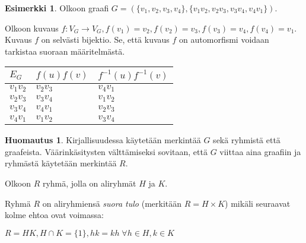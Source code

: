 \documentclass[a4paper, 12pt]{article}
\theoremstyle{definition}
\newtheorem{huom}{Huomautus}
\newtheorem{example}[mydef]{Esimerkki}
\theoremstyle{plain}
\begin{document}
\begin{example}
\label{ex:d4}
Olkoon graafi $G = (\{v_1, v_2, v_3, v_4\}, \{v_1v_2, v_2v_3, v_3v_4, v_4v_1\})$.

\begin{center}
\end{center}

Olkoon kuvaus $f: V_G \rightarrow V_G, f(v_1) = v_2, f(v_2) = v_3, f(v_3) = v_4, f(v_4) = v_1$. Kuvaus $f$ on selvästi bijektio. Se, että kuvaus $f$ on automorfismi voidaan tarkistaa suoraan määritelmästä.

\begin{center}
\begin{tabular} {l l l}
$E_G$ & $f(u)f(v)$ & $f^{-1}(u)f^{-1}(v)$ \\
\hline
$v_1v_2$ & $ v_2v_3$ & $v_4v_1$ \\
$v_2v_3$ & $ v_3v_4$ & $v_1v_2$ \\
$v_3v_4$ & $v_4v_1$ & $v_2v_3$ \\
$v_4v_1$ & $v_1v_2$ &  $v_3v_4$ \\
\end{tabular}

\end{center}
\end{example}

\begin{huom}
Kirjallisuudessa käytetään merkintää $G$ sekä ryhmistä että graafeista. Väärinkäsitysten välttämiseksi sovitaan, että $G$ viittaa aina graafiin ja ryhmästä käytetään merkintää $R$.
\end{huom}

Olkoon $R$ ryhmä, jolla on aliryhmät $H$ ja $K$. 

Ryhmä $R$ on aliryhmiensä \emph{suora tulo} (merkitään $R = H \times K$) mikäli seuraavat kolme ehtoa ovat voimassa:
\begin{center}
\begin{math}
R = HK, H \cap K = \{ 1\}, hk = kh \; \forall h \in H, k \in K
\end{math}
\end{center}
\end{document}
